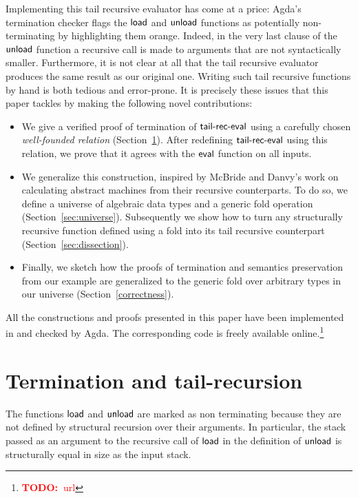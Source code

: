 \documentclass[sigplan,10pt,review]{acmart}
\newcommand\todo[1]{\textcolor{red}{\textbf{TODO:~}#1}}
\newcommand{\AF}{\AgdaFunction}
\newcommand{\nonterm}[1]{\hspace*{-0.1cm}\colorbox{orange!25}{#1}}
\begin{document}
Implementing this tail recursive evaluator has come at a price: Agda's
termination checker flags the \ensuremath{\AF{load}} and \ensuremath{\AF{unload}} functions as
potentially non-terminating by highlighting them
\nonterm{orange}. Indeed, in the very last clause of the \ensuremath{\AF{unload}}
function a recursive call is made to arguments that are not
syntactically smaller. Furthermore, it is not clear at all that the
tail recursive evaluator produces the same result as our original
one. Writing such tail recursive functions by hand is both tedious and
error-prone. It is precisely these issues that this paper tackles
by making the following novel contributions:

\begin{itemize}
\item We give a verified proof of termination of \ensuremath{\AF{tail\text{-}rec\text{-}eval}} using
  a carefully chosen \emph{well-founded relation}
  (Section~\ref{sec:basics}). After redefining \ensuremath{\AF{tail\text{-}rec\text{-}eval}} using
  this relation, we prove that it agrees with the \ensuremath{\AF{eval}} function on
  all inputs.
\item We generalize this construction, inspired by McBride and Danvy's
  work on calculating abstract machines from their recursive
  counterparts. To do so, we define a universe of algebraic data types
  and a generic fold operation
  (Section~\ref{sec:universe}). Subsequently we show how to turn any
  structurally recursive function defined using a fold into its tail
  recursive counterpart (Section~\ref{sec:dissection}).
\item Finally, we sketch how the proofs of termination and semantics
  preservation from our example are generalized to the generic fold
  over arbitrary types in our universe
  (Section~\ref{correctness}). 

\end{itemize}

All the constructions and proofs presented in this paper have been
implemented in and checked by Agda. The corresponding code is freely
available online.\footnote{\todo{url}}


\section{Termination and tail-recursion}
\label{sec:basics}
The functions \ensuremath{\AF{load}} and \ensuremath{\AF{unload}} are marked as non terminating
because they are not defined by structural recursion over their
arguments. In particular, the stack passed as an argument to the
recursive call of \ensuremath{\AF{load}} in the definition of \ensuremath{\AF{unload}} is structurally
equal in size as the input stack.
\end{document}
